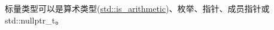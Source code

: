 标量类型可以是算术类型(\href{https://en.cppreference.com/w/cpp/types/is_arithmetic}{std::is\_arithmetic})、枚举、指针、成员指针或std::nullptr\_t。